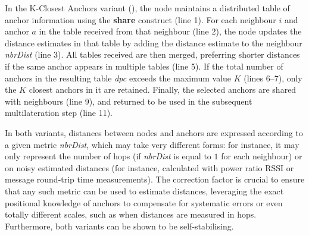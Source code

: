 \documentclass[runningheads]{llncs}
\begin{document}
In the K-Closest Anchors variant (), the node maintains a distributed table of anchor information using the \textbf{share} construct (line 1). For each neighbour $i$ and anchor $a$ in the table received from that neighbour (line 2), the node updates the distance estimates in that table by adding the distance estimate to the neighbour \emph{nbrDist} (line 3). All tables received are then merged, preferring shorter distances if the same anchor appears in multiple tables (line 5). If the total number of anchors in the resulting table \emph{dpc} exceeds the maximum value $K$ (lines 6–7), only the $K$ closest anchors in it are retained. Finally, the selected anchors are shared with neighbours (line 9), and returned to be used in the subsequent multilateration step (line 11).

In both variants, distances between nodes and anchors are expressed according to a given metric \emph{nbrDist}, which may take very different forms: for instance, it may only represent the number of hops (if \emph{nbrDist} is equal to $1$ for each neighbour) or on noisy estimated distances (for instance, calculated with power ratio RSSI or message round-trip time measurements). The correction factor is crucial to ensure that any such metric can be used to estimate distances, leveraging the exact positional knowledge of anchors to compensate for systematic errors or even totally different scales, such as when distances are measured in hops.
Furthermore, both variants can be shown to be self-stabilising.
\end{document}
